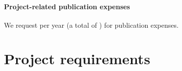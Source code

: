 \documentclass[10pt,fleqn,twoside]{article}
\newcommand{\missing}[1]{\textcolor{red}{\textbf{XXX #1 XXX}}}
\begin{document}
% 
% 
% 

\paragraph{\Tcol Project-related publication expenses}

We request  per year (a total of ) for
publication expenses.

% 
% 
% 
% 
% 
% 
% 
% 
% 
% 

\section{Project requirements}
\end{document}
